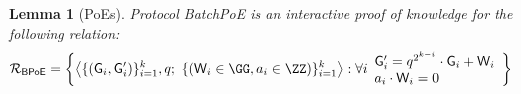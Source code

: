 \documentclass[12pt]{article}
\theoremstyle{Definition}
\newtheorem{lemma}{Lemma}
\begin{document}
	\begin{lemma}[PoEs]
		Protocol \textsf{BatchPoE} is an interactive proof of knowledge for the following relation:
		\[ \mathcal{R_\textsf{BPoE}} = \left\{
\big\langle \{(\gr{G}_i,\gr{G}_i')\}_{i=1}^{\numrounds}, q ; \ \{(\gr{W}_i\in \GG, a_i \in \ZZ)\}_{i=1}^k  \big\rangle
: \forall i
\begin{array}{l} 
 \gr{G}_i' = q^{2^{\numrounds-i}}  \cdot \gr{G}_i + \gr{W}_i \\ 
a_i\cdot \gr{W}_i=0
\end{array}\right\}
\]


	\end{lemma}
\end{document}
